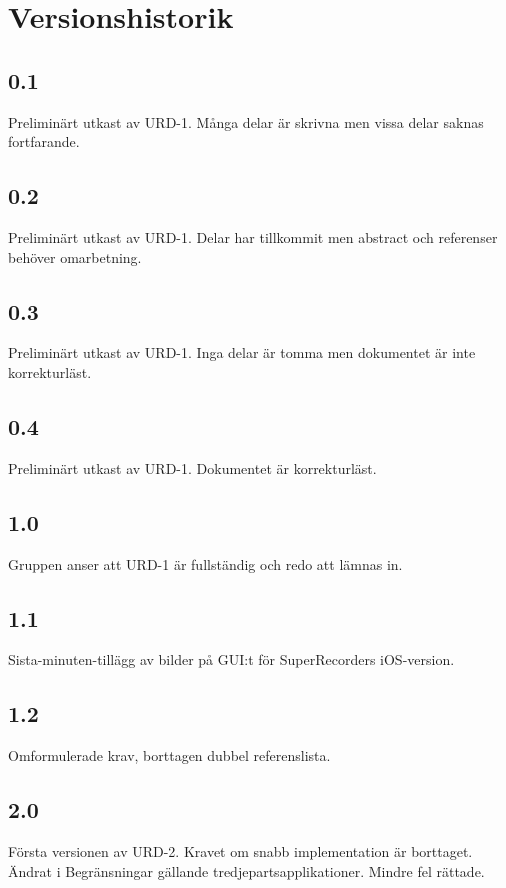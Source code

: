 \section*{Versionshistorik}

\subsection*{0.1}
Preliminärt utkast av URD-1. Många delar är skrivna men vissa delar saknas fortfarande.

\subsection*{0.2}
Preliminärt utkast av URD-1. Delar har tillkommit men abstract och referenser behöver omarbetning.

\subsection*{0.3}
Preliminärt utkast av URD-1. Inga delar är tomma men dokumentet är inte korrekturläst.

\subsection*{0.4}
Preliminärt utkast av URD-1. Dokumentet är korrekturläst.

\subsection*{1.0}
Gruppen anser att URD-1 är fullständig och redo att lämnas in.

\subsection*{1.1}
Sista-minuten-tillägg av bilder på GUI:t för SuperRecorders iOS-version.

\subsection*{1.2}
Omformulerade krav, borttagen dubbel referenslista.

\subsection*{2.0}
Första versionen av URD-2. Kravet om snabb implementation är borttaget. Ändrat i Begränsningar gällande tredjepartsapplikationer. Mindre fel rättade.
